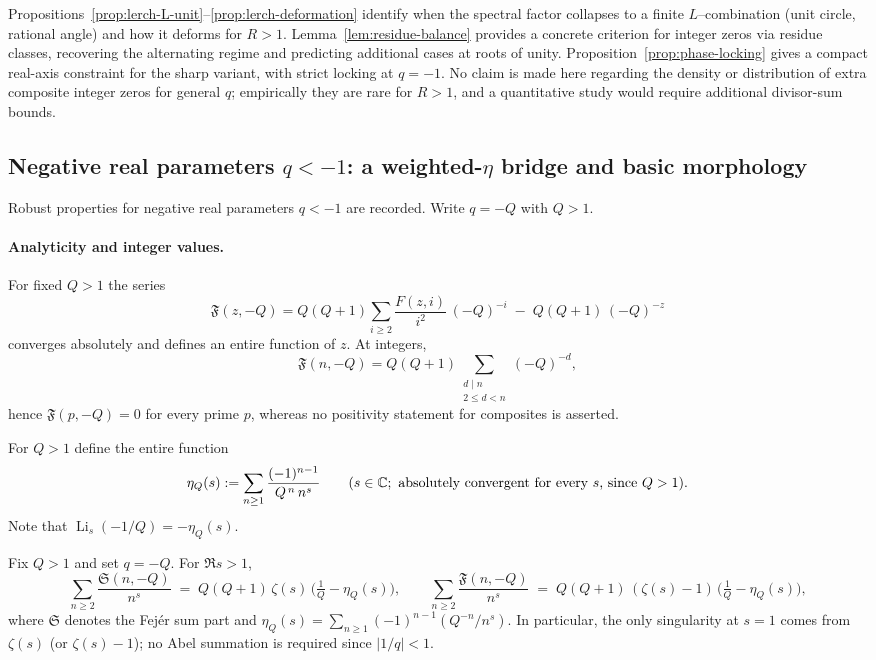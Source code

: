 \begin{remark}
Propositions~\ref{prop:lerch-L-unit}--\ref{prop:lerch-deformation} identify when the spectral factor
collapses to a finite $L$--combination (unit circle, rational angle) and how it deforms for $R>1$.
Lemma~\ref{lem:residue-balance} provides a concrete criterion for integer zeros via residue classes,
recovering the alternating regime and predicting additional cases at roots of unity.
Proposition~\ref{prop:phase-locking} gives a compact real-axis constraint for the sharp variant,
with strict locking at $q=-1$.
No claim is made here regarding the density or distribution of extra composite integer zeros for general $q$;
empirically they are rare for $R>1$, and a quantitative study would require additional divisor-sum bounds.
\end{remark}

\subsection{Negative real parameters \texorpdfstring{$q<-1$}{q<-1}: a weighted-\texorpdfstring{$\eta$}{eta} bridge and basic morphology}
\label{sec:qlessminus1}
Robust properties for negative real parameters $q<-1$ are recorded. Write $q=-Q$ with $Q>1$.

\paragraph{Analyticity and integer values.}
For fixed $Q>1$ the series
\[
\mathfrak F(z,-Q)=Q(Q+1)\sum_{i\ge2}\frac{F(z,i)}{i^2}\,(-Q)^{-i}\;-\;Q(Q+1)\,(-Q)^{-z}
\]
converges absolutely and defines an entire function of $z$. At integers,
\[
\mathfrak F(n,-Q)=Q(Q+1)\sum_{\substack{d\mid n\\2\le d<n}}(-Q)^{-d},
\]
hence $\mathfrak F(p,-Q)=0$ for every prime $p$, whereas no positivity statement for composites is asserted.

\begin{definition}
For $Q>1$ define the entire function
\[
\eta_{Q}(s):=\sum_{n\ge1}\frac{(-1)^{n-1}}{Q^{\,n}\,n^{s}}\qquad(s\in\C;\ \text{absolutely convergent for every $s$, since $Q>1$}).
\]
Note that $\operatorname{Li}_s(-1/Q)=-\eta_Q(s)$.
\end{definition}

\begin{proposition}[Dirichlet series for negative parameters $q=-Q<-1$]\label{prop:qlessminus1-dirichlet}
Fix $Q>1$ and set $q=-Q$. For $\Re s>1$,
\[
\sum_{n\ge2}\frac{\mathfrak S(n,-Q)}{n^{s}}
\;=\;Q(Q+1)\,\zeta(s)\,\Big(\tfrac1Q-\eta_Q(s)\Big),\qquad
\sum_{n\ge2}\frac{\mathfrak F(n,-Q)}{n^{s}}
\;=\;Q(Q+1)\,(\zeta(s)-1)\,\Big(\tfrac1Q-\eta_Q(s)\Big),
\]
where $\mathfrak S$ denotes the Fej\'er sum part and $\eta_Q(s)=\sum_{n\ge1}(-1)^{n-1}(Q^{-n}/n^{s})$. In particular, the only singularity at $s=1$ comes from $\zeta(s)$ (or $\zeta(s)-1$); no Abel summation is required since $|1/q|<1$.
\end{proposition}

